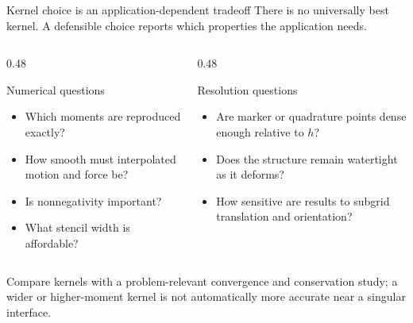 \documentclass[aspectratio=169,11pt]{beamer}
\begin{document}
\begin{frame}{Kernel choice is an application-dependent tradeoff}
There is no universally best kernel. A defensible choice reports which properties the application needs.

\begin{columns}[T,onlytextwidth]
  \begin{column}{0.48\textwidth}
  \begin{block}{Numerical questions}
    \begin{itemize}
      \item Which moments are reproduced exactly?
      \item How smooth must interpolated motion and force be?
      \item Is nonnegativity important?
      \item What stencil width is affordable?
    \end{itemize}
  \end{block}
  \end{column}
  \begin{column}{0.48\textwidth}
  \begin{block}{Resolution questions}
    \begin{itemize}
      \item Are marker or quadrature points dense enough relative to \(h\)?
      \item Does the structure remain watertight as it deforms?
      \item How sensitive are results to subgrid translation and orientation?
    \end{itemize}
  \end{block}
  \end{column}
\end{columns}

\begin{punchbox}
Compare kernels with a problem-relevant convergence and conservation study; a wider or higher-moment kernel is not automatically more accurate near a singular interface.
\end{punchbox}
\end{frame}
\end{document}

